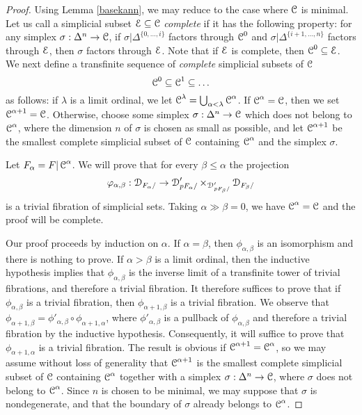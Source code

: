 \begin{proof}
Using Lemma \ref{basekann}, we may reduce to the case where $\operatorname{\mathcal{C}}$ is minimal.
Let us call a simplicial subset $\operatorname{\mathcal{E}} \subseteq \operatorname{\mathcal{C}}$ {\it complete} if it has the following property:
for any simplex $\sigma: \Delta^n \rightarrow \operatorname{\mathcal{C}}$, if $\sigma| \Delta^{ \{0, \ldots, i\} }$ factors through $\operatorname{\mathcal{C}}^{0}$ and $\sigma| \Delta^{ \{i+1, \ldots, n \} }$ factors through $\operatorname{\mathcal{E}}$, then $\sigma$
factors through $\operatorname{\mathcal{E}}$. Note that if $\operatorname{\mathcal{E}}$ is complete, then $\operatorname{\mathcal{C}}^{0} \subseteq \operatorname{\mathcal{E}}$.
We next define a transfinite sequence of {\em complete} simplicial subsets of $\operatorname{\mathcal{C}}$
$$ \operatorname{\mathcal{C}}^0 \subseteq \operatorname{\mathcal{C}}^1 \subseteq \ldots $$
as follows: if $\lambda$ is a limit ordinal, we let $\operatorname{\mathcal{C}}^{\lambda} = \bigcup_{ \alpha < \lambda} \operatorname{\mathcal{C}}^{\alpha}$. If $\operatorname{\mathcal{C}}^{\alpha} = \operatorname{\mathcal{C}}$, then we set $\operatorname{\mathcal{C}}^{\alpha+1} = \operatorname{\mathcal{C}}$. Otherwise, choose some simplex $\sigma: \Delta^n \rightarrow \operatorname{\mathcal{C}}$ which does not belong to $\operatorname{\mathcal{C}}^{\alpha}$, where the dimension $n$ of $\sigma$ is chosen as small as possible, and let
$\operatorname{\mathcal{C}}^{\alpha+1}$ be the smallest complete simplicial subset of $\operatorname{\mathcal{C}}$ containing
$\operatorname{\mathcal{C}}^{\alpha}$ and the simplex $\sigma$.

Let $F_{\alpha} = F | \operatorname{\mathcal{C}}^{\alpha}$. We will prove that for every
$\beta \leq \alpha$ the projection
$$ \varphi_{\alpha,\beta}: \operatorname{\mathcal{D}}_{F_{\alpha}/} \rightarrow \operatorname{\mathcal{D}}'_{p F_{\alpha}/}
\times_{ \operatorname{\mathcal{D}}'_{ p F_{\beta} / }} \operatorname{\mathcal{D}}_{F_{\beta} / }$$
is a trivial fibration of simplicial sets. Taking $\alpha \gg \beta = 0$, we have $\operatorname{\mathcal{C}}^{\alpha} = \operatorname{\mathcal{C}}$ and the proof will be complete.

Our proof proceeds by induction on $\alpha$. If $\alpha = \beta$, then $\phi_{\alpha,\beta}$ is an isomorphism and there is nothing to prove. If $\alpha > \beta$ is a limit ordinal, then the inductive hypothesis implies that $\phi_{\alpha,\beta}$ is the inverse limit of a transfinite tower of trivial fibrations, and therefore a trivial fibration. 
It therefore suffices to prove that if $\phi_{\alpha,\beta}$ is a trivial fibration, then $\phi_{\alpha+1, \beta}$ is a trivial fibration. We observe that $\phi_{\alpha+1,\beta} = \phi'_{\alpha,\beta} \circ \phi_{\alpha+1,\alpha}$, where $\phi'_{\alpha,\beta}$ is a pullback of $\phi_{\alpha,\beta}$ and
therefore a trivial fibration by the inductive hypothesis. Consequently, it will suffice to prove
that $\phi_{\alpha+1,\alpha}$ is a trivial fibration. The result is obvious if
$\operatorname{\mathcal{C}}^{\alpha+1} = \operatorname{\mathcal{C}}^{\alpha}$, so we may assume without loss of generality that 
$\operatorname{\mathcal{C}}^{\alpha+1}$ is the smallest complete simplicial subset of $\operatorname{\mathcal{C}}$ containing
$\operatorname{\mathcal{C}}^{\alpha}$ together with a simplex $\sigma: \Delta^n \rightarrow \operatorname{\mathcal{C}}$,
where $\sigma$ does not belong to $\operatorname{\mathcal{C}}^{\alpha}$. Since $n$ is chosen to be minimal, we may suppose that $\sigma$ is nondegenerate, and that the boundary of $\sigma$ already belongs to
$\operatorname{\mathcal{C}}^{\alpha}$.


\end{proof}
